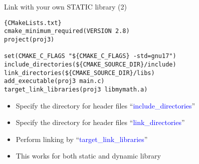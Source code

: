\begin{frame}[fragile]{Link with your own STATIC library (2)}
\begin{lstlisting}[linewidth=0.95\linewidth, firstnumber= 1, xleftmargin=0.02\linewidth]{CMakeLists.txt}
cmake_minimum_required(VERSION 2.8)
project(proj3)

set(CMAKE_C_FLAGS "${CMAKE_C_FLAGS} -std=gnu17")
include_directories(${CMAKE_SOURCE_DIR}/include)
link_directories(${CMAKE_SOURCE_DIR}/libs)
add_executable(proj3 main.c)
target_link_libraries(proj3 libmymath.a)

\end{lstlisting}

\begin{itemize}
	\item {Specify the directory for header files ``\textcolor{blue}{include\_directories}''}
	\item {Specify the directory for header files ``\textcolor{blue}{link\_directories}''}
	\item {Perform linking by ``\textcolor{blue}{target\_link\_libraries}''}
	\item {This works for both static and dynamic library}
\end{itemize}
\end{frame}